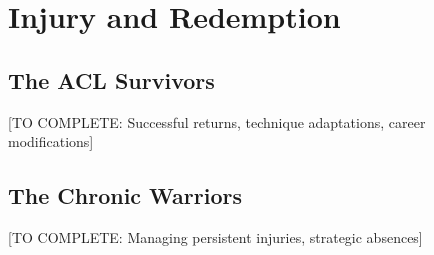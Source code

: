 \section{Injury and Redemption}

\subsection{The ACL Survivors}

[TO COMPLETE: Successful returns, technique adaptations, career modifications]

\subsection{The Chronic Warriors}

[TO COMPLETE: Managing persistent injuries, strategic absences]